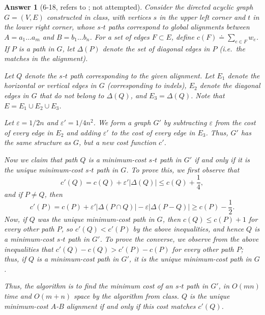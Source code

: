 \documentclass[11pt]{article}
\theoremstyle{numberplain}
\theoremstyle{nonumberplain}
\newtheorem{ans}{Answer}
\def\ve{{\varepsilon}}
\newcommand{\0}{{\mathbf{0}}}
\begin{document}
\begin{ans}[6-18, refers to \cite{solcornell}; not attempted]
Consider the directed acyclic graph $G = (V, E)$
constructed in class, with vertices $s$ in the upper
left corner and $t$ in the lower right corner, whose
$s$-$t$ paths correspond
to global alignments between $A=a_1\ldots a_m$ and $B=b_1\ldots b_n$.
For a set of edges $F \subset E$, define 
$c(F)\doteq \sum_{e\in F} w_e$.
If $P$ is a path in $G$, let $\Delta(P)$ denote the
set of diagonal edges in $P$ (i.e.~the {\em matches} in the alignment).

Let $Q$ denote the $s$-$t$ path corresponding to the given alignment.
Let $E_1$ denote the horizontal or vertical edges in $G$
(corresponding to indels), $E_2$ denote the diagonal edges in $G$
that do not belong to $\Delta(Q)$,
and $E_3 = \Delta(Q)$.
Note that $E = E_1 \cup E_2 \cup E_3$.

Let $\ve = 1 / 2n$ and $\ve' = 1 / 4n^2$.
We form a graph $G'$ by subtracting $\ve$ from the cost of
every edge in $E_2$ and adding $\ve'$
to the cost of every edge in $E_3$.
Thus, $G'$ has the same structure as $G$,
but a new cost function $c'$.

Now we claim that path $Q$
is a minimum-cost $s$-$t$ path in $G'$ if and only
if it is the unique minimum-cost $s$-$t$ path in $G$.
To prove this, we first observe that
$$c'(Q) = c(Q) + \ve' |\Delta(Q)| \leq c(Q) + \frac14,$$
and if $P \neq Q$, then
$$c'(P) = c(P) + \ve' |\Delta(P \cap Q)| - \ve |\Delta(P - Q)|
\geq c(P) - \frac12.$$
Now, if $Q$ was the unique minimum-cost path in $G$,
then $c(Q) \leq c(P) + 1$ for every other path $P$,
so $c'(Q) < c'(P)$ by the above inequalities,
and hence $Q$ is a minimum-cost $s$-$t$ path in $G'$.
To prove the converse, we observe from the above
inequalities that $c'(Q) - c(Q) > c'(P) - c(P)$
for every other path $P$; thus, if $Q$ is a minimum-cost path
in $G'$, it is the unique minimum-cost path in $G$.

Thus, the algorithm is to find the minimum cost of an
$s$-$t$ path in $G'$, in $O(mn)$ time and $O(m + n)$ space
by the algorithm from class.
$Q$ is the unique minimum-cost $A$-$B$ alignment if and only
if this cost matches $c'(Q)$.
\end{ans}
\end{document}
